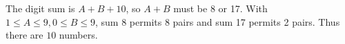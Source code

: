 The digit sum is $A+B+10$, so $A+B$ must be 8 or 17. With $1\le A\le9,0\le B\le9$, sum 8 permits 8 pairs and sum 17 permits 2 pairs. Thus there are $\boxed{10}$ numbers.
